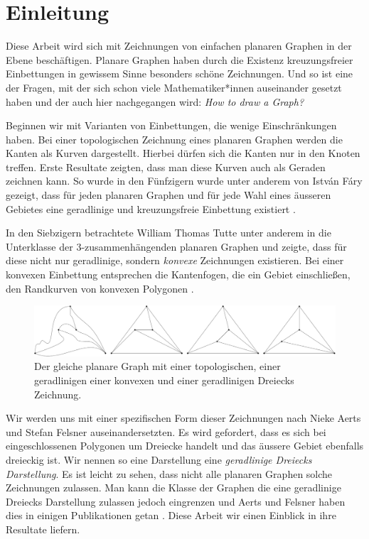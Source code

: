 \chapter{Einleitung}
Diese Arbeit wird sich mit Zeichnungen von einfachen planaren Graphen in der Ebene beschäftigen. Planare Graphen haben durch die Existenz kreuzungsfreier Einbettungen in gewissem Sinne besonders schöne Zeichnungen. Und so ist eine der Fragen, mit der sich schon viele Mathematiker*innen auseinander gesetzt haben und der auch hier nachgegangen wird: \glqq\textit{How to draw a Graph?}\grqq\cite{tutte63}

Beginnen wir mit Varianten von Einbettungen, die wenige Einschränkungen haben. Bei einer topologischen Zeichnung eines planaren Graphen werden die Kanten als Kurven dargestellt. Hierbei dürfen sich die Kanten nur in den Knoten treffen. Erste Resultate zeigten, dass man diese Kurven auch als Geraden zeichnen kann. So wurde in den Fünfzigern wurde unter anderem von István Fáry gezeigt, dass für jeden planaren Graphen und für jede Wahl eines äusseren Gebietes eine geradlinige und kreuzungsfreie Einbettung existiert \cite{fary48}.

In den Siebzigern betrachtete William Thomas Tutte unter anderem in \cite{tutte63} die Unterklasse der 3-zusam\-men\-hängenden planaren Graphen und zeigte, dass für diese nicht nur geradlinige, sondern \textit{konvexe} Zeichnungen existieren. Bei einer konvexen Einbettung entsprechen die Kantenfogen, die ein Gebiet einschließen, den Randkurven von konvexen Polygonen \cite{tutte63}.

\begin{figure}[h]
	\centering
  \includegraphics[width=1\textwidth]{topo_straight_convex.png}
	\caption{Der gleiche planare Graph mit einer topologischen, einer geradlinigen einer konvexen und einer geradlinigen Dreiecks Zeichnung.}
	\label{topo_straight_convex}
\end{figure}

Wir werden uns mit einer spezifischen Form dieser Zeichnungen nach Nieke Aerts und Stefan Felsner auseinandersetzten. Es wird gefordert, dass es sich bei eingeschlossenen Polygonen um Dreiecke handelt und das äussere Gebiet ebenfalls dreieckig ist. Wir nennen so eine Darstellung eine \textit{geradlinige Dreiecks Darstellung}. Es ist leicht zu sehen, dass nicht alle planaren Graphen solche Zeichnungen zulassen. Man kann die Klasse der Graphen die eine geradlinige Dreiecks Darstellung zulassen jedoch eingrenzen und Aerts und Felsner haben dies in einigen Publikationen getan \cite{af13h,af13,af15}. Diese Arbeit wir einen Einblick in ihre Resultate liefern.\\

